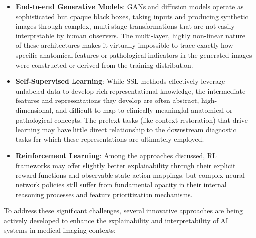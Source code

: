 \documentclass{article}
\begin{document}
\begin{itemize}
    \item \textbf{End-to-end Generative Models}: GANs and diffusion models operate as sophisticated but opaque black boxes, taking inputs and producing synthetic images through complex, multi-stage transformations that are not easily interpretable by human observers. The multi-layer, highly non-linear nature of these architectures makes it virtually impossible to trace exactly how specific anatomical features or pathological indicators in the generated images were constructed or derived from the training distribution.
    
    \item \textbf{Self-Supervised Learning}: While SSL methods effectively leverage unlabeled data to develop rich representational knowledge, the intermediate features and representations they develop are often abstract, high-dimensional, and difficult to map to clinically meaningful anatomical or pathological concepts. The pretext tasks (like context restoration) that drive learning may have little direct relationship to the downstream diagnostic tasks for which these representations are ultimately employed.
    
    \item \textbf{Reinforcement Learning}: Among the approaches discussed, RL frameworks may offer slightly better explainability through their explicit reward functions and observable state-action mappings, but complex neural network policies still suffer from fundamental opacity in their internal reasoning processes and feature prioritization mechanisms.
\end{itemize}

To address these significant challenges, several innovative approaches are being actively developed to enhance the explainability and interpretability of AI systems in medical imaging contexts:
\end{document}
